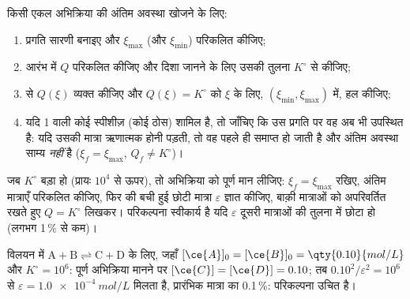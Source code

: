 \begin{method}[अंतिम अवस्था खोजना]\label{met:b1:extent-q-and-k:final-state}
किसी एकल अभिक्रिया की अंतिम अवस्था खोजने के लिए:
\begin{enumerate}
  \item प्रगति सारणी बनाइए और $\xi_{\max}$ (और $\xi_{\min}$) परिकलित कीजिए;
  \item आरंभ में $Q$ परिकलित कीजिए और दिशा जानने के लिए उसकी तुलना $K^\circ$ से
        कीजिए;
  \item {} से $Q(\xi)$ व्यक्त कीजिए और $Q(\xi) = K^\circ$ को
        $\xi$ के लिए, $(\xi_{\min}, \xi_{\max})$ में, हल कीजिए;
  \item यदि  1 वाली कोई स्पीशीज़ (कोई ठोस) शामिल है, तो जाँचिए कि
        उस प्रगति पर वह अब भी उपस्थित है: यदि उसकी मात्रा ऋणात्मक होनी पड़ती,
        तो वह पहले ही समाप्त हो जाती है और अंतिम अवस्था साम्य \emph{नहीं} है
        ($\xi_f = \xi_{\max}$, $Q_f \ne K^\circ$)।
\end{enumerate}
\end{method}

\begin{method}[मात्रात्मक-अभिक्रिया परिकल्पना]\label{met:b1:extent-q-and-k:quantitative}
जब $K^\circ$ बड़ा हो (प्रायः $10^4$ से ऊपर), तो अभिक्रिया को पूर्ण
मान लीजिए: $\xi_f = \xi_{\max}$ रखिए, अंतिम मात्राएँ परिकलित कीजिए, फिर
 की बची हुई छोटी मात्रा $\varepsilon$ ज्ञात कीजिए, बाक़ी मात्राओं को
अपरिवर्तित रखते हुए $Q =
K^\circ$ लिखकर।
परिकल्पना स्वीकार्य है यदि
$\varepsilon$ दूसरी मात्राओं की तुलना में छोटा हो (लगभग
1\,\% से कम)।
\end{method}

\begin{example}[एक मात्रात्मक अभिक्रिया]\label{ex:b1:extent-q-and-k:quant}
विलयन में $\mathrm{A + B \rightleftharpoons C + D}$ के लिए, जहाँ $[\ce{A}]_0 = [\ce{B}]_0 =
\qty{0.10}{mol/L}$ और $K^\circ = 10^6$: पूर्ण अभिक्रिया मानने पर $[\ce{C}]
= [\ce{D}] = 0.10$; तब $0.10^2/\varepsilon^2 = 10^6$ से $\varepsilon
= \qty{1.0e-4}{mol/L}$ मिलता है, प्रारंभिक मात्रा का 0.1\,\%: परिकल्पना
उचित है।
\end{example}

